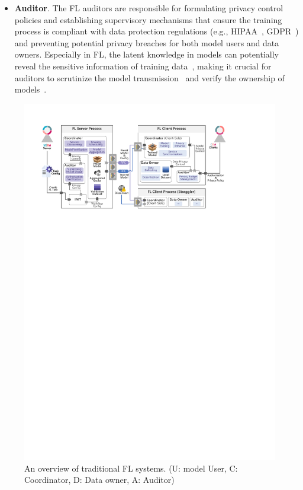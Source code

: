 \begin{itemize}
    \item \textbf{Auditor}. The FL auditors are responsible for formulating privacy control policies and establishing supervisory mechanisms that ensure the training process is compliant with data protection regulations (e.g., HIPAA~\cite{act1996health}, GDPR~\cite{voigt2017eu}) and preventing potential privacy breaches for both model users and data owners. Especially in FL, the latent knowledge in models can potentially reveal the sensitive information of training data~\cite{wang2019beyond, zhu2019deep, jin2021cafe}, making it crucial for auditors to scrutinize the model transmission~\cite{wei2021gradient, li2022auditing} and verify the ownership of models~\cite{tekgul2021waffle, shao2022fedtracker}.
\end{itemize}

\begin{figure}[t]
    \centering
    \includegraphics[width=\linewidth]{fig/fl_frame.pdf}
    \caption{An overview of traditional FL systems. (U: model User, C: Coordinator, D: Data owner, A: Auditor)}
    \Description{}
    \label{fig:fl}
  \end{figure}

